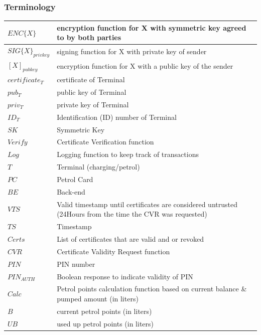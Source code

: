\subsubsection{Terminology}
    \begin{center}
        \begin{tabular}{| l | p{8cm} |}
            \hline
            $ENC\{X\}$ & encryption function for X with symmetric key agreed to by both parties\\ \hline
            $SIG\{X\}_{privkey}$ & signing function for X with private key of sender \\ \hline
            $[X]_{pubkey}$ & encryption function for X with a public key of the sender \\ \hline
            $certificate_{T}$ & certificate of Terminal \\ \hline
            $pub_{T}$ & public key of Terminal \\ \hline
            $priv_{T}$ & private key of Terminal  \\ \hline
            $ID_{T}$ & Identification (ID) number of Terminal \\ \hline
            $SK$ & Symmetric Key \\ \hline
            $Verify$ & Certificate Verification function \\ \hline
            $Log$ & Logging function to keep track of transactions \\ \hline
            $T$ & Terminal (charging/petrol) \\ \hline
            $PC$ & Petrol Card \\ \hline
            $BE$ & Back-end \\ \hline
            $VTS$ & Valid timestamp until certificates are considered untrusted (24Hours from the time the CVR was requested) \\ \hline
            $TS$ & Timestamp \\ \hline
            $Certs$ & List of certificates that are valid and or revoked \\ \hline
            $CVR$ & Certificate Validity Request function \\ \hline
            $PIN$ & PIN number \\ \hline
            $PIN_{AUTH}$ & Boolean response to indicate validity of PIN \\ \hline
            $Calc$ & Petrol points calculation function based on current balance \& pumped amount (in liters) \\ \hline
            $B$ & current petrol points (in liters) \\ \hline
            $UB$ & used up petrol points (in liters) \\ \hline
        \end{tabular}
    \end{center}

